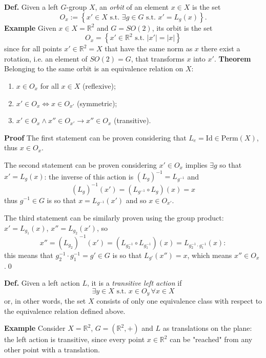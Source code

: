 \textbf{Def.} Given a left $G$-group $X$, an \textit{orbit} of an element $x\in X$ is
the set
$$O_x:=\left\{x'\in X\text{ s.t. }\exists g\in G \text{ s.t. }x' = L_g(x)\right\}.$$
\textbf{Example} Given $x\in X=\mathbb{R}^2$ and $G=SO(2)$, its orbit is the set
$$O_x = \left\{x'\in\mathbb{R}^2\text{ s.t. }|x'| = |x|\right\}$$
since for all points $x'\in\mathbb{R}^2=X$ that have the same norm as $x$ there
exist a rotation, i.e. an element of $SO(2)=G$, that transforms $x$ into $x'$.
\newpage
\textbf{Theorem} Belonging to the same orbit is an equivalence relation on $X$:
\begin{enumerate}
    \item $x\in O_x$ for all $x\in X$ (reflexive);
    \item $x'\in O_x \iff x\in O_{x'}$ (symmetric);
    \item $x'\in O_x\land x''\in O_{x'} \rightarrow x''\in O_x$ (transitive). 
\end{enumerate}
\textbf{Proof}
The first statement can be proven considering that
$L_e = \text{Id}\in\text{Perm}(X)$, thus $x\in O_x$.

The second statement can be proven considering $x'\in O_x$ implies $\exists g$ so
that $x' = L_g(x)$: the inverse of this action is
$\left(L_g\right)^{-1} = L_{g^{-1}}$ and
$$(L_{g})^{-1}(x') = (L_{g^{-1}}\circ L_g)(x) = x$$
thus $g^{-1}\in G$ is so that $x=L_{g^{-1}}(x')$ and so $x\in O_{x'}$.

The third statement can be similarly proven using the group product: $x'=L_{g_1}(x)$,
$x'' = L_{g_2}(x')$, so
$$x'' = (L_{g_2})^{-1}(x') = (L_{g_2^{-1}}\circ L_{g_1^{-1}})(x) = L_{g_2^{-1}\cdot
g_1^{-1}}(x):$$
this means that $g_2^{-1}\cdot g_1^{-1}=g'\in G$ is so that $L_{g'}(x'') = x$, which
means $x''\in O_x$.\qed

\textbf{Def.} Given a left action $L$, it is a \textit{transitive left action} if
$$\exists y\in X\text{ s.t. } x\in O_y\,\forall x\in X$$
or, in other words, the set $X$ consists of only one equivalence class with respect
to the equivalence relation defined above.

\textbf{Example} Consider $X = \mathbb{R}^2$, $G = (\mathbb{R}^2,+)$ and $L$ as
translations on the plane: the left action is transitive, since every point $x\in
\mathbb{R}^2$ can be "reached" from any other point with a translation.
